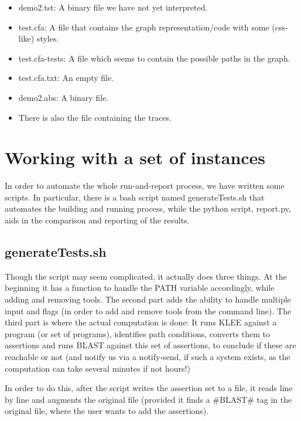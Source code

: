 \documentclass[a4paper, 11pt,twoside]{article}
\begin{document}
\begin{itemize}
  \item  demo2.tst: A binary file we have not yet interpreted.
  \item  test.cfa: A file that contains the graph representation/code with some (css-like) styles.
  \item  test.cfa-tests: A file which seems to contain the possible paths in the graph.
  \item  test.cfa.txt: An empty file.
  \item  demo2.abs: A binary file.
  \item  There is also the file containing the traces.
\end{itemize}


\section{Working with a set of instances}

In order to automate the whole run-and-report process, we have written some scripts. In particular, there is a bash script named generateTests.sh that automates the building and running process, while the python script, report.py, aids in the comparison and reporting of the results.

\subsection{generateTests.sh}

Though the script may seem complicated, it actually does three things. At the beginning it has a function to handle the PATH variable accordingly, while adding and removing tools. The second part adds the ability to handle multiple input and flags (in order to add and remove tools from the command line). The third part is where the actual computation is done: It runs KLEE against a program (or set of programs), identifies path conditions, converts them to assertions and runs BLAST against this set of assertions, to conclude if these are reachable or not (and notify us via a notify-send, if such a system exists, as the computation can take several minutes if not hours!)

In order to do this, after the script writes the assertion set to a file, it reads line by line and augments the original file (provided it finds a \#BLAST\# tag in the original file, where the user wants to add the assertions).
\end{document}
